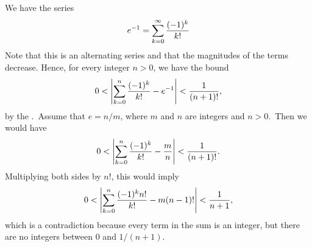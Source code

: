 \documentclass[12pt]{article}
\begin{document}
We have the series
\[
e^{-1} = \sum_{k=0}^\infty {(-1)^k \over k!}
\]
Note that this is an alternating series and that the magnitudes of the
terms decrease.  Hence, for every integer $n > 0$, we have the bound
\[
0 <
\left| \sum_{k=0}^{n} {(-1)^k \over k!} - e^{-1} \right| <
{1 \over (n+1)!},
\]
by the .\, Assume 
that $e = n/m$, where $m$ and $n$ are integers and $n > 0$.\, 
Then we would have
\[
0 <
\left| \sum_{k=0}^{n} {(-1)^k \over k!} - 
{m \over n} \right| <
{1 \over (n+1)!} .
\]
Multiplying both sides by $n!$, this would imply
\[
0 <
\left| \sum_{k=0}^{n} {(-1)^k n! \over k!} - 
m (n-1)! \right| <
{1 \over n+1} ,
\]
which is a contradiction because every term in the sum is an integer,
but there are no integers between $0$ and $1/(n+1)$.
\end{document}
